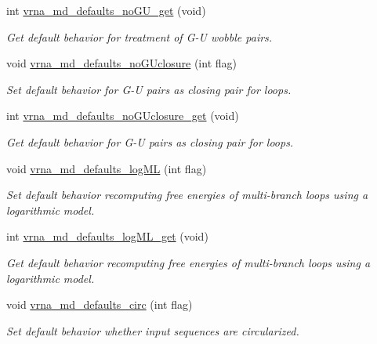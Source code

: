 \begin{DoxyCompactItemize}
int \mbox{\hyperlink{group__model__details_ga5faa7d4e536d7fe36ec25428c0cf2563}{vrna\+\_\+md\+\_\+defaults\+\_\+no\+G\+U\+\_\+get}} (void)
\begin{DoxyCompactList}\small\item\em Get default behavior for treatment of G-\/U wobble pairs. \end{DoxyCompactList}\item 
void \mbox{\hyperlink{group__model__details_gade5b9951d71ca2fb357a4e6c0c18ccd1}{vrna\+\_\+md\+\_\+defaults\+\_\+no\+G\+Uclosure}} (int flag)
\begin{DoxyCompactList}\small\item\em Set default behavior for G-\/U pairs as closing pair for loops. \end{DoxyCompactList}\item 
int \mbox{\hyperlink{group__model__details_ga4f7fdad083243a5348d63320ddaa70f3}{vrna\+\_\+md\+\_\+defaults\+\_\+no\+G\+Uclosure\+\_\+get}} (void)
\begin{DoxyCompactList}\small\item\em Get default behavior for G-\/U pairs as closing pair for loops. \end{DoxyCompactList}\item 
void \mbox{\hyperlink{group__model__details_ga3de50a73455d88c3957386933b8e1f90}{vrna\+\_\+md\+\_\+defaults\+\_\+log\+ML}} (int flag)
\begin{DoxyCompactList}\small\item\em Set default behavior recomputing free energies of multi-\/branch loops using a logarithmic model. \end{DoxyCompactList}\item 
int \mbox{\hyperlink{group__model__details_ga93f04e070d529c5d0bb87c9681f6ad29}{vrna\+\_\+md\+\_\+defaults\+\_\+log\+M\+L\+\_\+get}} (void)
\begin{DoxyCompactList}\small\item\em Get default behavior recomputing free energies of multi-\/branch loops using a logarithmic model. \end{DoxyCompactList}\item 
void \mbox{\hyperlink{group__model__details_ga4e1deb3e91a8a99e5c6dd905a5eb0186}{vrna\+\_\+md\+\_\+defaults\+\_\+circ}} (int flag)
\begin{DoxyCompactList}\small\item\em Set default behavior whether input sequences are circularized. \end{DoxyCompactList}\item 

\end{DoxyCompactItemize}
